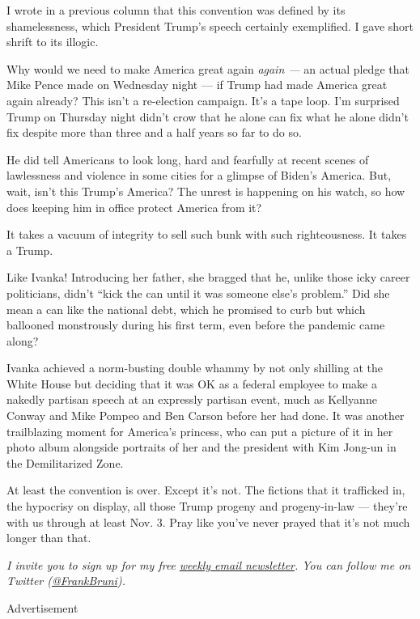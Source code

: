 I wrote in a previous column that this convention was defined by its
shamelessness, which President Trump's speech certainly exemplified. I
gave short shrift to its illogic.

Why would we need to make America great again \emph{again ---} an actual
pledge that Mike Pence made on Wednesday night --- if Trump had made
America great again already? This isn't a re-election campaign. It's a
tape loop. I'm surprised Trump on Thursday night didn't crow that he
alone can fix what he alone didn't fix despite more than three and a
half years so far to do so.

He did tell Americans to look long, hard and fearfully at recent scenes
of lawlessness and violence in some cities for a glimpse of Biden's
America. But, wait, isn't this Trump's America? The unrest is happening
on his watch, so how does keeping him in office protect America from it?

It takes a vacuum of integrity to sell such bunk with such
righteousness. It takes a Trump.

Like Ivanka! Introducing her father, she bragged that he, unlike those
icky career politicians, didn't ``kick the can until it was someone
else's problem.'' Did she mean a can like the national debt, which he
promised to curb but which ballooned monstrously during his first term,
even before the pandemic came along?

Ivanka achieved a norm-busting double whammy by not only shilling at the
White House but deciding that it was OK as a federal employee to make a
nakedly partisan speech at an expressly partisan event, much as
Kellyanne Conway and Mike Pompeo and Ben Carson before her had done. It
was another trailblazing moment for America's princess, who can put a
picture of it in her photo album alongside portraits of her and the
president with Kim Jong-un in the Demilitarized Zone.

At least the convention is over. Except it's not. The fictions that it
trafficked in, the hypocrisy on display, all those Trump progeny and
progeny-in-law --- they're with us through at least Nov. 3. Pray like
you've never prayed that it's not much longer than that.

\emph{I invite you to sign up for my free}
\href{https://www.nytimes3xbfgragh.onion/newsletters/frank-bruni}{\emph{weekly
email newsletter}}\emph{. You can follow me on Twitter
(}\href{https://twitter.com/FrankBruni}{\emph{@FrankBruni}}\emph{).}

Advertisement

